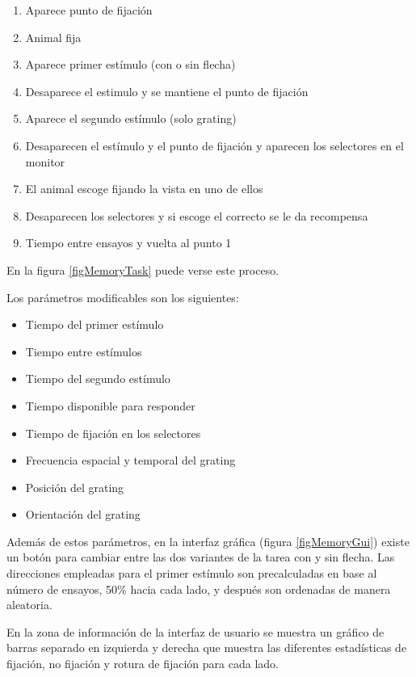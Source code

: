 \documentclass[conference]{IEEEtran}
\begin{document}
\begin{enumerate}
	\item Aparece punto de fijación
	\item Animal fija
	\item Aparece primer estímulo (con o sin flecha)
	\item Desaparece el estimulo y se mantiene el punto de fijación
	\item Aparece el segundo estímulo (solo grating)
	\item Desaparecen el estímulo y el punto de fijación y aparecen los selectores en el monitor
	\item El animal escoge fijando la vista en uno de ellos
	\item Desaparecen los selectores y si escoge el correcto se le da recompensa
	\item Tiempo entre ensayos y vuelta al punto 1
\end{enumerate}

En la figura \ref{figMemoryTask} puede verse este proceso. 


Los parámetros modificables son los siguientes:

\begin{itemize}
	\item Tiempo del primer estímulo
	\item Tiempo entre estímulos
	\item Tiempo del segundo estímulo
	\item Tiempo disponible para responder
	\item Tiempo de fijación en los selectores
	\item Frecuencia espacial y temporal del grating
	\item Posición del grating
	\item Orientación del grating

\end{itemize}


Además de estos parámetros, en la interfaz gráfica (figura \ref{figMemoryGui}) existe un botón para cambiar entre las dos variantes de la tarea con y sin flecha.
Las direcciones empleadas para el primer estímulo son precalculadas en base al número de ensayos, 50\% hacia cada lado, y después son ordenadas de manera aleatoria.

En la zona de información de la interfaz de usuario se muestra un gráfico de barras separado en izquierda y derecha que muestra las diferentes estadísticas de fijación, no fijación y rotura de fijación para cada lado.
\end{document}
